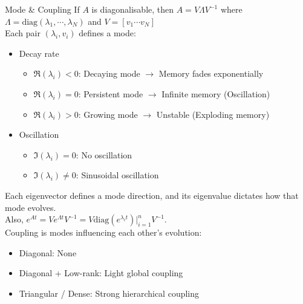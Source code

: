 \documentclass[xcolor=dvipsnames,aspectratio=169]{beamer}
\begin{document}
            \begin{frame}{Mode \& Coupling}
                \small
                If $A$ is diagonalisable, then $A = V \Lambda V^{-1}$ where $\Lambda = \mathrm{diag} (\lambda_{1}, \cdots, \lambda_{N})$ and $V = [v_{1} \cdots v_{N}]$ \\
                Each pair $(\lambda_{i}, v_{i})$ defines a mode:

                \begin{itemize}
                    \item Decay rate
                    \begin{itemize}
                        \item $\Re (\lambda_{i}) < 0$: Decaying mode $\to$ Memory fades exponentially
                        \item $\Re (\lambda_{i}) = 0$: Persistent mode $\to$ Infinite memory (Oscillation)
                        \item $\Re (\lambda_{i}) > 0$: Growing mode $\to$ Unstable (Exploding memory)
                    \end{itemize}
                    \item Oscillation
                    \begin{itemize}
                        \item $\Im (\lambda_{i}) = 0$: No oscillation
                        \item $\Im (\lambda_{i}) \neq 0$: Sinusoidal oscillation
                    \end{itemize}
                \end{itemize}

                Each eigenvector defines a mode direction, and its eigenvalue dictates how that mode evolves. \\
                Also, $e^{At} = V e^{\Lambda t} V^{-1} = V \mathrm{diag} (e^{\lambda_{i}t}) |_{i = 1}^{n} V^{-1}$. \\
                Coupling is modes influencing each other's evolution:

                \begin{itemize}
                    \item Diagonal: None
                    \item Diagonal + Low-rank: Light global coupling
                    \item Triangular / Dense: Strong hierarchical coupling
                \end{itemize}
            \end{frame}
\end{document}
